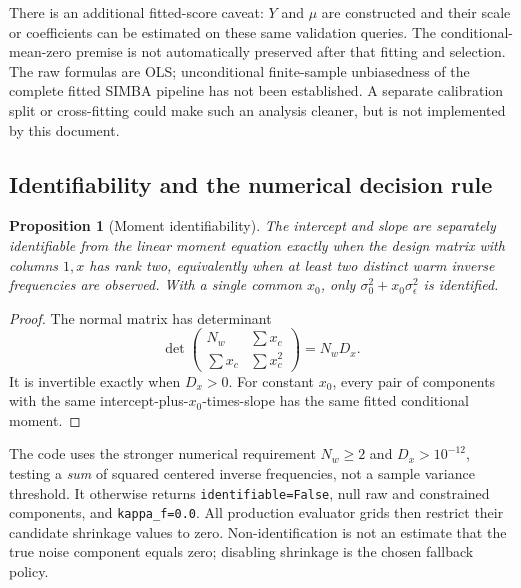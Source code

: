 \documentclass[11pt,a4paper]{article}
\newtheorem{proposition}[theorem]{Proposition}
\theoremstyle{remark}
\newcommand{\code}[1]{\texttt{\small #1}}
\begin{document}
There is an additional fitted-score caveat: $Y$ and $\mu$ are constructed
and their scale or coefficients can be estimated on these same validation
queries. The conditional-mean-zero premise is not automatically preserved
after that fitting and selection. The raw formulas are OLS; unconditional
finite-sample unbiasedness of the complete fitted SIMBA pipeline has not
been established. A separate calibration split or cross-fitting could
make such an analysis cleaner, but is not implemented by this document.

\subsection{Identifiability and the numerical decision rule}
\begin{proposition}[Moment identifiability]
The intercept and slope are separately identifiable from the linear
moment equation exactly when the design matrix with columns $1,x$ has
rank two, equivalently when at least two distinct warm inverse frequencies
are observed. With a single common $x_0$, only
$\sigma_0^2+x_0\sigma_\epsilon^2$ is identified.
\end{proposition}
\begin{proof}
The normal matrix has determinant
\begin{equation}
 \det\begin{pmatrix}N_w&\sum x_c\\\sum x_c&\sum x_c^2\end{pmatrix}
 =N_wD_x.
\end{equation}
It is invertible exactly when $D_x>0$. For constant $x_0$, every pair of
components with the same intercept-plus-$x_0$-times-slope has the same
fitted conditional moment.
\end{proof}
The code uses the stronger numerical requirement $N_w\geq2$ and
$D_x>10^{-12}$, testing a \emph{sum} of squared centered inverse
frequencies, not a sample variance threshold. It otherwise returns
\code{identifiable=False}, null raw and constrained components, and
\code{kappa\_f=0.0}. All production evaluator grids then restrict their
candidate shrinkage values to zero. Non-identification is not an estimate
that the true noise component equals zero; disabling shrinkage is the
chosen fallback policy.
\end{document}
